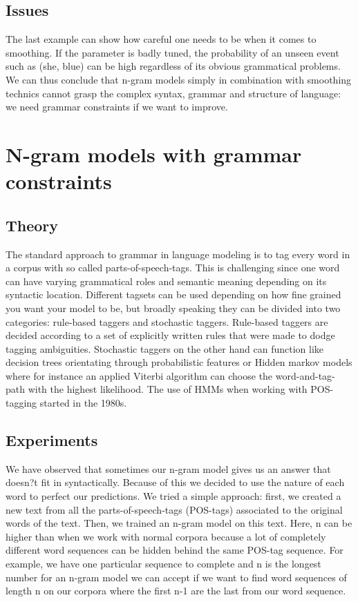 \documentclass[a4paper,12pt]{article}
\begin{document}
\subsection{Issues}
	The last example can show how careful one needs to be when it comes to smoothing. If the parameter is badly tuned, the probability of an unseen event such as (she, blue) can be high regardless of its obvious grammatical problems. We can thus conclude that n-gram models simply in combination with smoothing technics cannot grasp the complex syntax, grammar and structure of language: we need grammar constraints if we want to improve.


\section{N-gram models with grammar constraints}
\label{sec:ngramgrammar}

\subsection{Theory}

The standard approach to grammar in language modeling is to tag every word in a corpus with so called parts-of-speech-tags. This is challenging since one word can have varying grammatical roles and semantic meaning depending on its syntactic location. Different tagsets can be used depending on how fine grained you want your model to be, but broadly speaking they can be divided into two categories: rule-based taggers and stochastic taggers. Rule-based taggers are decided according to a set of explicitly written rules that were made to dodge tagging ambiguities. Stochastic taggers on the other hand can function like decision trees orientating through probabilistic features or Hidden markov models where for instance an applied Viterbi algorithm can choose the word-and-tag-path with the highest likelihood. The use of HMMs when working with POS-tagging started in the 1980s. 

\subsection{Experiments}

We have observed that sometimes our n-gram model gives us an answer that doesn?t fit in syntactically. Because of this we decided to use the nature of each word to perfect our predictions. We tried a simple approach: first, we created a new text from all the parts-of-speech-tags (POS-tags) associated to the original words of the text. Then, we trained an n-gram model on this text. Here, n can be higher than when we work with normal corpora because a lot of completely different word sequences can be hidden behind the same POS-tag sequence. For example, we have one particular sequence to complete and n is the longest number for an n-gram model we can accept if we want to find word sequences of length n on our corpora where the first n-1 are the last from our word sequence.
\end{document}
